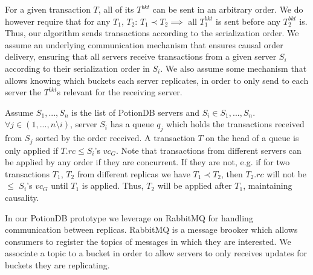 \documentclass{vldb}
\begin{document}
For a given transaction $T$, all of its $T^{bkt}$ can be sent in an arbitrary order.
We do however require that for any $T_1$, $T_2$: $T_1 \prec T_2 \implies$ all $T_1^{bkt}$ is sent before any $T_2^{bkt}$ is.
Thus, our algorithm sends transactions according to the serialization order.
We assume an underlying communication mechanism that ensures causal order delivery, ensuring that all servers receive transactions from a given server $S_i$ according to their serialization order in $S_i$.
We also assume some mechanism that allows knowing which buckets each server replicates, in order to only send to each server the $T^{bkt}$s relevant for the receiving server.

Assume $S_1, ..., S_n$ is the list of PotionDB servers and $S_i \in S_1, ..., S_n$.
$\forall j \in (1, ..., n \setminus i)$, server $S_i$ has a queue $q_j$ which holds the transactions received from $S_j$ sorted by the order received.
A transaction $T$ on the head of a queue is only applied if $T.rc \leq S_i$'s $vc_G$.
Note that transactions from different servers can be applied by any order if they are concurrent. 
If they are not, e.g. if for two transactions $T_1$, $T_2$ from different replicas we have $T_1 \prec T_2$, then $T_2.rc$ will not be $\leq$ $S_i$'s $vc_G$ until $T_1$ is applied.
Thus, $T_2$ will be applied after $T_1$, maintaining causality. %

In our PotionDB prototype we leverage on RabbitMQ \cite{???} for handling communication between replicas.
RabbitMQ is a message brooker which allows consumers to register the topics of messages in which they are interested.
We associate a topic to a bucket in order to allow servers to only receives updates for buckets they are replicating.
\end{document}
